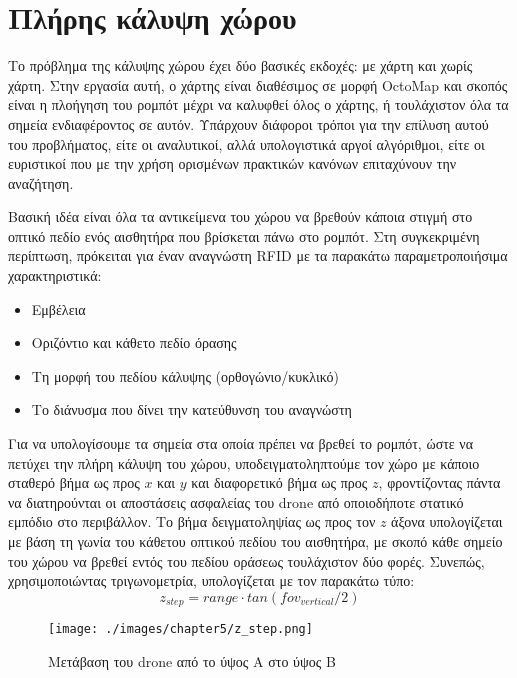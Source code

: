 \section{Πλήρης κάλυψη χώρου}
\label{section:coverage_impl}

Το πρόβλημα της κάλυψης χώρου έχει δύο βασικές εκδοχές: με χάρτη και χωρίς χάρτη. Στην εργασία αυτή, ο χάρτης είναι διαθέσιμος σε μορφή OctoMap και σκοπός είναι η πλοήγηση του ρομπότ μέχρι να καλυφθεί όλος ο χάρτης, ή τουλάχιστον όλα τα σημεία ενδιαφέροντος σε αυτόν. Υπάρχουν διάφοροι τρόποι για την επίλυση αυτού του προβλήματος, είτε οι αναλυτικοί, αλλά υπολογιστικά αργοί αλγόριθμοι, είτε οι ευριστικοί που με την χρήση ορισμένων πρακτικών κανόνων επιταχύνουν την αναζήτηση.

Βασική ιδέα είναι όλα τα αντικείμενα του χώρου να βρεθούν κάποια στιγμή στο οπτικό πεδίο ενός αισθητήρα που βρίσκεται πάνω στο ρομπότ. Στη συγκεκριμένη περίπτωση, πρόκειται για έναν αναγνώστη RFID με τα παρακάτω παραμετροποιήσιμα χαρακτηριστικά:
\begin{itemize}
    \item {Εμβέλεια}
    \item {Οριζόντιο και κάθετο πεδίο όρασης}
    \item {Τη μορφή του πεδίου κάλυψης (ορθογώνιο/κυκλικό)}
    \item {Το διάνυσμα που δίνει την κατεύθυνση του αναγνώστη}
\end{itemize}

Για να υπολογίσουμε τα σημεία στα οποία πρέπει να βρεθεί το ρομπότ, ώστε να πετύχει την πλήρη κάλυψη του χώρου, υποδειγματοληπτούμε τον χώρο με κάποιο σταθερό βήμα ως προς $x$ και $y$ και διαφορετικό βήμα ως προς $z$, φροντίζοντας πάντα να διατηρούνται οι αποστάσεις ασφαλείας του drone από οποιοδήποτε στατικό εμπόδιο στο περιβάλλον. Το βήμα δειγματοληψίας ως προς τον $z$ άξονα υπολογίζεται με βάση τη γωνία του κάθετου οπτικού πεδίου του αισθητήρα, με σκοπό κάθε σημείο του χώρου να βρεθεί εντός του πεδίου οράσεως τουλάχιστον δύο φορές. Συνεπώς, χρησιμοποιώντας τριγωνομετρία, υπολογίζεται με τον παρακάτω τύπο:
\begin{equation}
    z_{step} = range \cdot tan(fov_{vertical} / 2)
\end{equation}

\begin{figure}[!ht]
    \centering
    \texttt{[image: ./images/chapter5/z\_step.png]}
    \caption{Μετάβαση του drone από το ύψος Α στο ύψος Β}
    \label{fig:z_step}
\end{figure} 

